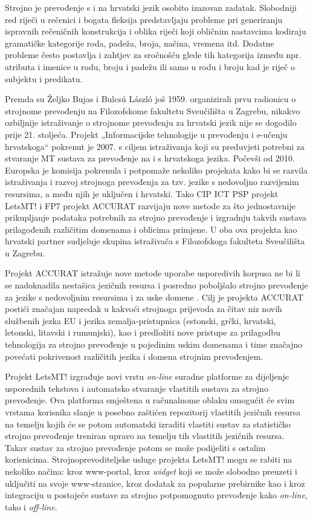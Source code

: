 \begin{multicols}{2}
Strojno je prevođenje s i na hrvatski jezik osobito izazovan zadatak. Slobodniji red riječi u rečenici i bogata fleksija predstavljaju probleme pri generiranju ispravnih rečeničnih konstrukcija i oblika riječi koji obličnim nastavcima kodiraju gramatičke kategorije roda, padeža, broja, načina, vremena itd. Dodatne probleme često postavlja i zahtjev za sročnošću glede tih kategorija između npr. atributa i imenice u rodu, broju i padežu ili samo u rodu i broju kad je riječ o subjektu i predikatu.

Premda su Željko Bujas i Bulcsú László još 1959. organizirali prvu radionicu o strojnome prevođenju \cite{art4} na Filozofskome fakultetu Sveučilišta u Zagrebu, nikakvo ozbiljnije istraživanje o strojnome prevođenju za hrvatski jezik nije se dogodilo prije 21. stoljeća. Projekt „Informacijske tehnologije u prevođenju i e-učenju hrvatskoga“ \cite{str22} pokrenut je 2007. s ciljem istraživanja koji su preduvjeti potrebni za stvaranje MT sustava za prevođenje na i s hrvatskoga jezika. Počevši od 2010. Europska je komisija pokrenula i potpomaže nekoliko projekata kako bi se razvila istraživanja i razvoj strojnoga prevođenja za tzv. jezike s nedovoljno razvijenim resursima, a među njih je uključen i hrvatski. Tako CIP ICT PSP projekt LetsMT! \cite{str23} i FP7 projekt ACCURAT \cite{str24} razvijaju nove metode za što jednostavnije prikupljanje podataka potrebnih za strojno prevođenje i izgradnju takvih sustava prilagođenih različitim domenama i oblicima primjene. U oba ova projekta kao hrvatski partner sudjeluje skupina istraživača s Filozofskoga fakulteta Sveučilišta u Zagrebu.

Projekt ACCURAT \cite{pro3} istražuje nove metode uporabe usporedivih korpusa ne bi li se nadoknadila nestašica jezičnih resursa i posredno poboljšalo strojno prevođenje za jezike s nedovoljnim resursima i za uske domene \cite{pro4}. Cilj je projekta ACCURAT postići značajan napredak u kakvoći strojnoga prijevoda za čitav niz novih službenih jezka EU i jezika zemalja-pristupnica (estonski, grčki, hrvatski, letonski, litavski i rumunjski), kao i predložiti nove pristupe za prilagodbu tehnologija za strojno prevođenje u pojedinim uskim domenama i time značajno povećati pokrivenost različitih jezika i domena strojnim prevođenjem.

Projekt LetsMT! \cite{pro5} izgrađuje novi vrstu \emph{on-line} suradne platforme za dijeljenje usporednih tekstova i automatsko stvaranje vlastitih sustava za strojno prevođenje. Ova platforma smještena u računalnome oblaku omogućit će svim vrstama korisnika slanje u posebno zaštićen repozitorij vlastitih jezičnih resursa na temelju kojih će se potom automatski izraditi vlastiti sustav za statističko strojno prevođenje treniran upravo na temelju tih vlastitih jezičnih resursa. Takav sustav za strojno prevođenje potom se može podijeliti s ostalim korisnicima. Strojnoprevoditeljske usluge projekta LetsMT! mogu se rabiti na nekoliko načina: kroz www-portal, kroz \emph{widget} koji se može slobodno preuzeti i uključiti na svoje www-stranice, kroz dodatak za popularne prebirnike kao i kroz integraciju u postojeće sustave za strojno potpomognuto prevođenje kako \emph{on-line}, tako i \emph{off-line}.


\end{multicols}
